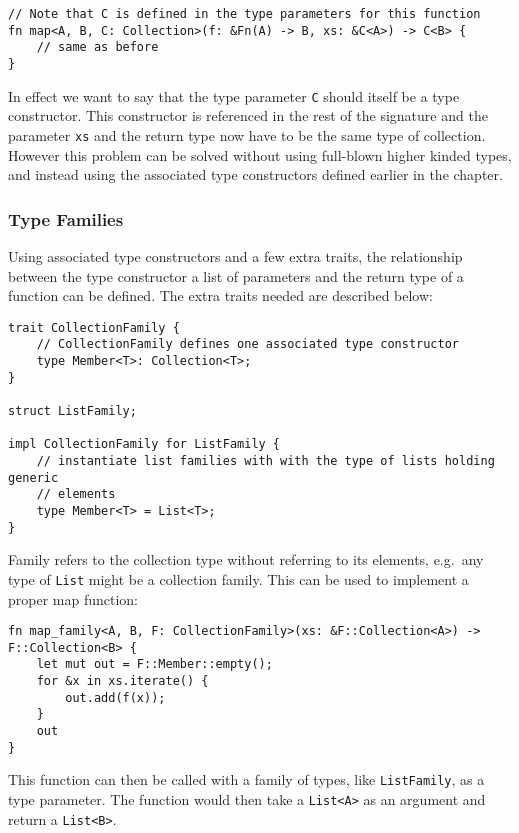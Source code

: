 \begin{lstlisting}[nolol]
// Note that C is defined in the type parameters for this function
fn map<A, B, C: Collection>(f: &Fn(A) -> B, xs: &C<A>) -> C<B> {
    // same as before
}
\end{lstlisting}

In effect we want to say that the type parameter \lstinline{C} should itself be
a type constructor. This constructor is referenced in the rest of the signature
and the parameter \lstinline{xs} and the return type now have to be the same
type of collection. However this problem can be solved without using full-blown
higher kinded types, and instead using the associated type constructors defined
earlier in the chapter.

\subsubsection{Type Families}
Using associated type constructors and a few extra traits, the relationship
between the type constructor a list of parameters and the return type of a
function can be defined. The extra traits needed are described below:

\begin{lstlisting}[nolol]
trait CollectionFamily {
    // CollectionFamily defines one associated type constructor
    type Member<T>: Collection<T>;
}

struct ListFamily;

impl CollectionFamily for ListFamily {
    // instantiate list families with with the type of lists holding generic
    // elements
    type Member<T> = List<T>;
}
\end{lstlisting}

Family refers to the collection type without referring to its elements, e.g.\
any type of \lstinline{List} might be a collection family. This can be used to
implement a proper map function:

\begin{lstlisting}[nolol]
fn map_family<A, B, F: CollectionFamily>(xs: &F::Collection<A>) -> F::Collection<B> {
    let mut out = F::Member::empty();
    for &x in xs.iterate() {
        out.add(f(x));
    }
    out
}
\end{lstlisting}

This function can then be called with a family of types, like \lstinline{ListFamily},
as a type parameter. The function would then take a \lstinline{List<A>} as an
argument and return a \lstinline{List<B>}.

